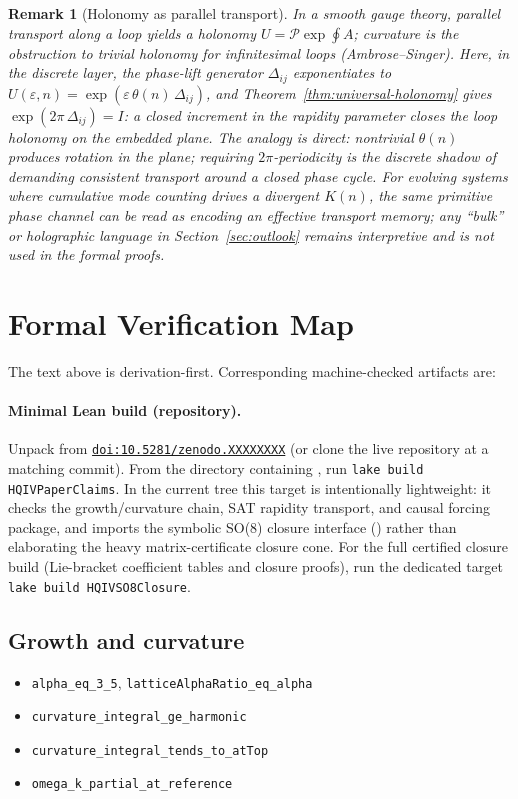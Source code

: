 \documentclass[11pt]{amsart}
\newtheorem{remark}[theorem]{Remark}
\newcommand{\PaperZenodoDoi}{10.5281/zenodo.XXXXXXXX}
\newcommand{\PaperArtifactBundleZip}{\path{paper_refs_bundle_2026-05-06.zip}}
\newcommand{\PaperZenodoDeposit}{\href{https://doi.org/\PaperZenodoDoi}{\texttt{doi:\PaperZenodoDoi}}}
\begin{document}
\begin{remark}[Holonomy as parallel transport]
In a smooth gauge theory, parallel transport along a loop yields a holonomy \(U=\mathcal P\exp\oint A\); curvature is the obstruction to trivial holonomy for infinitesimal loops (Ambrose--Singer). Here, in the discrete layer, the phase-lift generator \(\Delta_{ij}\) exponentiates to \(U(\varepsilon,n)=\exp(\varepsilon\,\theta(n)\,\Delta_{ij})\), and Theorem~\ref{thm:universal-holonomy} gives \(\exp(2\pi\,\Delta_{ij})=I\): a \emph{closed} increment in the rapidity parameter closes the loop holonomy on the embedded plane. The analogy is direct: nontrivial \(\theta(n)\) produces rotation in the plane; requiring \(2\pi\)-periodicity is the discrete shadow of demanding consistent transport around a closed phase cycle. For evolving systems where cumulative mode counting drives a divergent \(K(n)\), the same primitive phase channel can be read as encoding an effective transport memory; any ``bulk'' or holographic language in Section~\ref{sec:outlook} remains interpretive and is not used in the formal proofs.
\end{remark}

\appendix
\section{Formal Verification Map}

The text above is derivation-first. Corresponding machine-checked artifacts are:

\paragraph{Minimal Lean build (repository).}
Unpack \PaperArtifactBundleZip{} from \PaperZenodoDeposit{} (or clone the live \cite{hqiv-lean} repository at a matching commit). From the directory containing , run \texttt{lake build HQIVPaperClaims}. In the current tree this target is intentionally lightweight: it checks the growth/curvature chain, SAT rapidity transport, and causal forcing package, and imports the symbolic SO(8) closure interface () rather than elaborating the heavy matrix-certificate closure cone.
For the full certified closure build (Lie-bracket coefficient tables and closure proofs), run the dedicated target \texttt{lake build HQIVSO8Closure}.

\subsection*{Growth and curvature}
\begin{itemize}
\item \texttt{alpha\_eq\_3\_5}, \texttt{latticeAlphaRatio\_eq\_alpha}
\item \texttt{curvature\_integral\_ge\_harmonic}
\item \texttt{curvature\_integral\_tends\_to\_atTop}
\item \texttt{omega\_k\_partial\_at\_reference}
\end{itemize}
\end{document}
